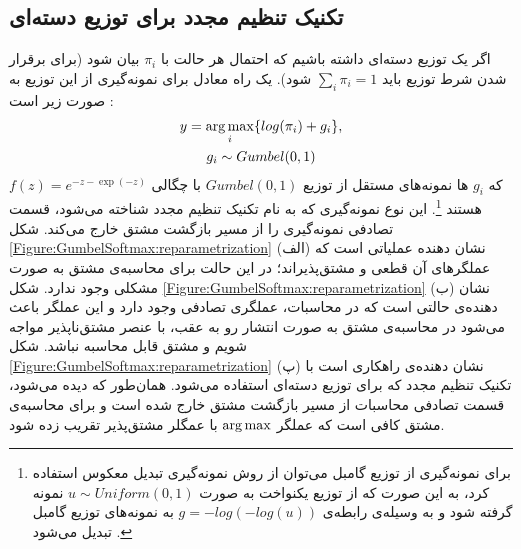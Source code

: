 \subsection{تکنیک تنظیم مجدد برای توزیع دسته‌ای}
	\label{Method:GumbelSoftmax:reparametrization}
اگر یک توزیع دسته‌ای داشته باشیم که احتمال هر حالت با $\pi_i$ بیان شود (برای برقرار شدن شرط توزیع باید
$\sum_i \pi_i = 1$
شود).
یک راه معادل برای نمونه‌گیری از این توزیع به صورت زیر است
\cite{JanGuPoo17}:
\begin{equation}
\begin{gathered}
y = \operatorname*{arg\,max}_i \{log(\pi_i) + g_i\}, \\
g_i \sim Gumbel(0,1)
\end{gathered}
\end{equation}
که $g_i$ ها نمونه‌های مستقل از توزیع
$Gumbel(0,1)$
با چگالی
$f(z) = e^{-z - \exp(-z)}$
هستند
\footnote{
	برای نمونه‌گیری از توزیع گامبل می‌توان از روش نمونه‌گیری تبدیل معکوس
	استفاده کرد، به این صورت که از توزیع یکنواخت  به صورت 
	$u \sim Uniform(0,1)$
	نمونه گرفته شود و به وسیله‌ی رابطه‌ی
	$g=-log(-log(u))$
	به نمونه‌های توزیع گامبل تبدیل می‌شود
	\cite{JanGuPoo17}.
	}.
این نوع نمونه‌گیری که به نام تکنیک تنظیم مجدد
شناخته می‌شود، قسمت تصادفی نمونه‌گیری را از مسیر بازگشت مشتق خارج می‌کند. 
\newline
شکل
\ref{Figure:GumbelSoftmax:reparametrization}
(الف) نشان دهنده عملیاتی است که عملگر‌های آن قطعی و مشتق‌پذیراند؛ در این حالت برای محاسبه‌ی مشتق به صورت 
مشکلی وجود ندارد. شکل
\ref{Figure:GumbelSoftmax:reparametrization}
(ب) نشان دهنده‌ی حالتی است که در محاسبات، عملگری تصادفی وجود دارد و این عملگر باعث می‌شود در محاسبه‌ی مشتق به صورت انتشار رو به عقب، با عنصر مشتق‌ناپذیر مواجه شویم و مشتق قابل محاسبه نباشد. شکل
\ref{Figure:GumbelSoftmax:reparametrization}
(پ) نشان دهنده‌ی راهکاری است با تکنیک تنظیم مجدد که برای توزیع دسته‌ای استفاده می‌شود. همان‌طور که دیده می‌شود، قسمت تصادفی محاسبات از مسیر بازگشت مشتق خارج شده است و برای محاسبه‌ی مشتق کافی است  که عملگر 
$\operatorname*{arg\,max}$
با عمگلر مشتق‌پذیر تقریب زده شود.


